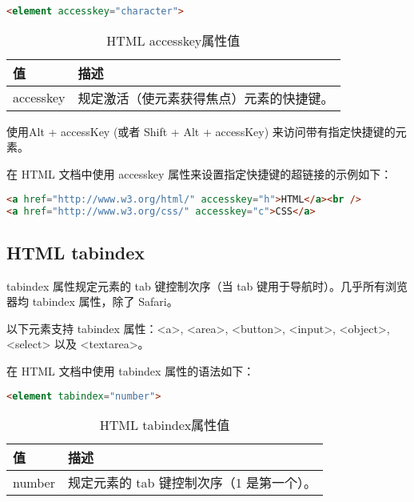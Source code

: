 \begin{lstlisting}[language=HTML]
<element accesskey="character">
\end{lstlisting}

\begin{table}[!h]
\centering
\vspace{-10pt}
\caption{HTML accesskey属性值}
\label{html_lang_attribute}
\begin{tabular}{|m{80pt}|m{290pt}|}
\hline
值	&描述\\
\hline
accesskey	&规定激活（使元素获得焦点）元素的快捷键。\\
\hline
\end{tabular}
\end{table}

使用Alt + accessKey (或者 Shift + Alt + accessKey) 来访问带有指定快捷键的元素。

在 HTML 文档中使用 accesskey 属性来设置指定快捷键的超链接的示例如下：

\begin{lstlisting}[language=HTML]
<a href="http://www.w3.org/html/" accesskey="h">HTML</a><br />
<a href="http://www.w3.org/css/" accesskey="c">CSS</a>
\end{lstlisting}

\clearpage


\subsection{HTML tabindex}

tabindex 属性规定元素的 tab 键控制次序（当 tab 键用于导航时）。几乎所有浏览器均 tabindex 属性，除了 Safari。

以下元素支持 tabindex 属性：<a>, <area>, <button>, <input>, <object>, <select> 以及 <textarea>。

在 HTML 文档中使用 tabindex 属性的语法如下：

\begin{lstlisting}[language=HTML]
<element tabindex="number">
\end{lstlisting}

\begin{table}[!h]
\centering
\vspace{-10pt}
\caption{HTML tabindex属性值}
\label{html_tabindex_attribute}
\begin{tabular}{|m{80pt}|m{290pt}|}
\hline
值	&描述\\
\hline
number	&规定元素的 tab 键控制次序（1 是第一个）。\\
\hline
\end{tabular}
\end{table}

